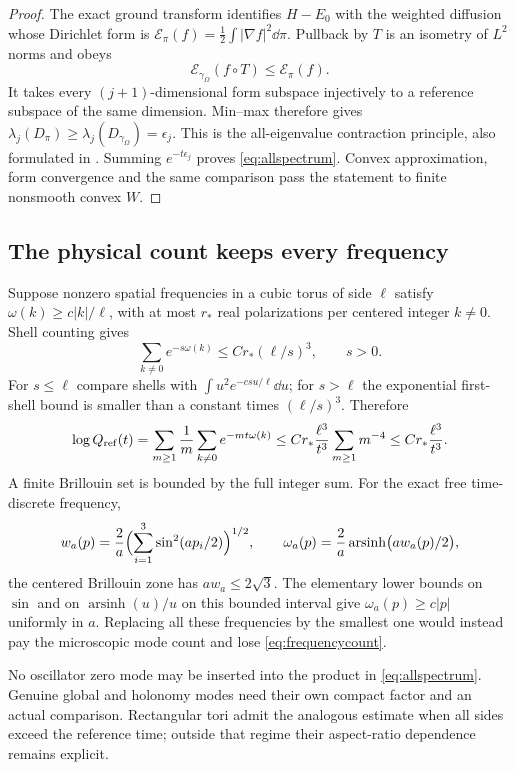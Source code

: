 \documentclass[11pt,letterpaper]{article}
\numberwithin{equation}{section}
\theoremstyle{definition}\newtheorem{definition}[theorem]{Definition}
\theoremstyle{remark}\newtheorem{remark}[theorem]{Remark}
\begin{document}
\begin{proof}
The exact ground transform identifies $H-E_0$ with the weighted diffusion whose Dirichlet form is
$\mathcal E_\pi(f)=\tfrac12\int|\nabla f|^2\dd\pi$.
Pullback by $T$ is an isometry of $L^2$ norms and obeys
\[
 \mathcal E_{\gamma_\Omega}(f\circ T)\le\mathcal E_\pi(f).
\]
It takes every $(j+1)$-dimensional form subspace injectively to a reference subspace of the same dimension. Min--max therefore gives
$\lambda_j(D_\pi)\ge\lambda_j(D_{\gamma_\Omega})=\epsilon_j$.
This is the all-eigenvalue contraction principle, also formulated in \cite{MilmanSpectral}. Summing $e^{-t\epsilon_j}$ proves \eqref{eq:allspectrum}. Convex approximation, form convergence and the same comparison pass the statement to finite nonsmooth convex $W$.
\end{proof}

\subsection{The physical count keeps every frequency}

Suppose nonzero spatial frequencies in a cubic torus of side $\ell$ satisfy
$\omega(k)\ge c|k|/\ell$, with at most $r_*$ real polarizations per centered integer $k\ne0$. Shell counting gives
\[
 \sum_{k\ne0}e^{-s\omega(k)}\le C r_*(\ell/s)^3,
 \qquad s>0.
\]
For $s\le\ell$ compare shells with $\int u^2e^{-csu/\ell}\dd u$; for $s>\ell$ the exponential first-shell bound is smaller than a constant times $(\ell/s)^3$. Therefore
\begin{equation}
 \log Q_{\rm ref}(t)
 =\sum_{m\ge1}\frac1m\sum_{k\ne0}e^{-mt\omega(k)}
 \le C r_*\frac{\ell^3}{t^3}\sum_{m\ge1}m^{-4}
 \le C r_*\frac{\ell^3}{t^3}.
 \label{eq:frequencycount}
\end{equation}
A finite Brillouin set is bounded by the full integer sum. For the exact free time-discrete frequency,
\[
 w_a(p)=\frac2a\Bigl(\sum_{i=1}^3\sin^2(ap_i/2)\Bigr)^{1/2},\qquad
 \omega_a(p)=\frac2a\operatorname{arsinh}\bigl(aw_a(p)/2\bigr),
\]
the centered Brillouin zone has $aw_a\le2\sqrt3$. The elementary lower bounds on $\sin$ and on $\operatorname{arsinh}(u)/u$ on this bounded interval give $\omega_a(p)\ge c|p|$ uniformly in $a$. Replacing all these frequencies by the smallest one would instead pay the microscopic mode count and lose \eqref{eq:frequencycount}.

No oscillator zero mode may be inserted into the product in \eqref{eq:allspectrum}. Genuine global and holonomy modes need their own compact factor and an actual comparison. Rectangular tori admit the analogous estimate when all sides exceed the reference time; outside that regime their aspect-ratio dependence remains explicit.
\end{document}
